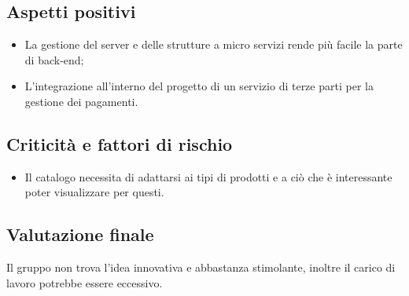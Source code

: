 \subsection{Aspetti positivi}
\begin{itemize}
\item La gestione del server e delle strutture a micro servizi rende più facile la parte di back-end;
\item L'integrazione all'interno del progetto di un servizio di terze parti per la gestione dei pagamenti.
\end{itemize}

\subsection{Criticità e fattori di rischio}
\begin{itemize}
\item Il catalogo necessita di adattarsi ai tipi di prodotti e a ciò che è interessante poter visualizzare per questi.
\end{itemize}

\subsection{Valutazione finale}
Il gruppo non trova l'idea innovativa e abbastanza stimolante, inoltre il carico di lavoro potrebbe essere eccessivo.
